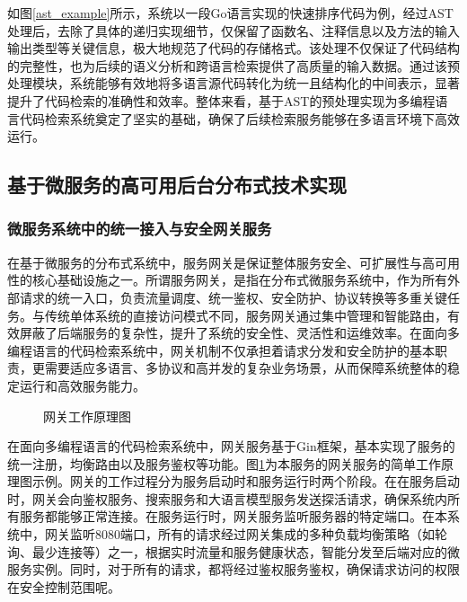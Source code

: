 \documentclass[UTF8,a4paper,12pt]{ctexart}
\numberwithin{equation}{section}
\begin{document}
如图\ref{ast_example}所示，系统以一段Go语言实现的快速排序代码为例，经过AST处理后，去除了具体的递归实现细节，仅保留了函数名、注释信息以及方法的输入输出类型等关键信息，极大地规范了代码的存储格式。该处理不仅保证了代码结构的完整性，也为后续的语义分析和跨语言检索提供了高质量的输入数据。通过该预处理模块，系统能够有效地将多语言源代码转化为统一且结构化的中间表示，显著提升了代码检索的准确性和效率。整体来看，基于AST的预处理实现为多编程语言代码检索系统奠定了坚实的基础，确保了后续检索服务能够在多语言环境下高效运行。\par
\subsection{基于微服务的高可用后台分布式技术实现}
\subsubsection{微服务系统中的统一接入与安全网关服务}
在基于微服务的分布式系统中，服务网关是保证整体服务安全、可扩展性与高可用性的核心基础设施之一。所谓服务网关，是指在分布式微服务系统中，作为所有外部请求的统一入口，负责流量调度、统一鉴权、安全防护、协议转换等多重关键任务。与传统单体系统的直接访问模式不同，服务网关通过集中管理和智能路由，有效屏蔽了后端服务的复杂性，提升了系统的安全性、灵活性和运维效率。在面向多编程语言的代码检索系统中，网关机制不仅承担着请求分发和安全防护的基本职责，更需要适应多语言、多协议和高并发的复杂业务场景，从而保障系统整体的稳定运行和高效服务能力。\par
\begin{figure}[H]
	\caption{网关工作原理图}
	\label{gateway}
\end{figure}
在面向多编程语言的代码检索系统中，网关服务基于Gin框架，基本实现了服务的统一注册，均衡路由以及服务鉴权等功能。图\ref{gateway}为本服务的网关服务的简单工作原理图示例。网关的工作过程分为服务启动时和服务运行时两个阶段。在在服务启动时，网关会向鉴权服务、搜索服务和大语言模型服务发送探活请求，确保系统内所有服务都能够正常连接。在服务运行时，网关服务监听服务器的特定端口。在本系统中，网关监听8080端口，所有的请求经过网关集成的多种负载均衡策略（如轮询、最少连接等）之一，根据实时流量和服务健康状态，智能分发至后端对应的微服务实例。同时，对于所有的请求，都将经过鉴权服务鉴权，确保请求访问的权限在安全控制范围呢。\par
\end{document}
